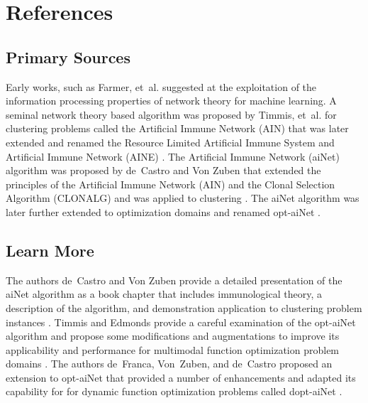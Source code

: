 \documentclass[a4paper, 11pt]{article}
\begin{document}
\section{References}
\label{sec:references}

% 
% 
\subsection{Primary Sources}
Early works, such as Farmer, et~al. \cite{Farmer1986} suggested at the exploitation of the information processing properties of network theory for machine learning.
A seminal network theory based algorithm was proposed by Timmis, et~al. for clustering problems called the Artificial Immune Network (AIN) \cite{Timmis2000} that was later extended and renamed the Resource Limited Artificial Immune System \cite{Timmis2001} and Artificial Immune Network (AINE) \cite{Knight2001}.
The Artificial Immune Network (aiNet) algorithm was proposed by de~Castro and Von Zuben that extended the principles of the Artificial Immune Network (AIN) and the Clonal Selection Algorithm (CLONALG) and was applied to clustering \cite{Castro2000a}. The aiNet algorithm was later further extended to optimization domains and renamed opt-aiNet \cite{Castro2002c}.

% 
% 
\subsection{Learn More}
The authors de~Castro and Von Zuben provide a detailed presentation of the aiNet algorithm as a book chapter that includes immunological theory, a description of the algorithm, and demonstration application to clustering problem instances \cite{Castro2001}.
Timmis and Edmonds provide a careful examination of the opt-aiNet algorithm and propose some modifications and augmentations to improve its applicability and performance for multimodal function optimization problem domains \cite{Timmis2004}.
The authors de~Franca, Von~Zuben, and de~Castro proposed an extension to opt-aiNet that provided a number of enhancements and adapted its capability for for dynamic function optimization problems called dopt-aiNet \cite{Franca2005}.



% 
% 
\end{document}
